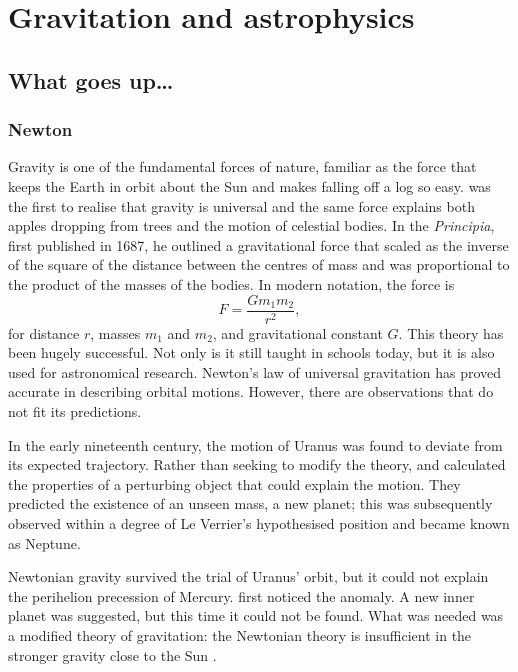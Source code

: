 \chapter{Gravitation and astrophysics}\label{ch:Let-there-be-gravity}

\section{What goes up\ldots}

\subsection{Newton}

Gravity is one of the fundamental forces of nature, familiar as the force that keeps the Earth in orbit about the Sun and makes falling off a log so easy. \citet[book 3]{Newton1999} was the first to realise that gravity is universal and the same force explains both apples dropping from trees and the motion of celestial bodies. In the \textit{Principia}, first published in 1687, he outlined a gravitational force that scaled as the inverse of the square of the distance between the centres of mass and was proportional to the product of the masses of the bodies. In modern notation, the force is
\begin{equation}
F = \dfrac{G m_1 m_2}{r^2},
\end{equation}
for distance $r$, masses $m_1$ and $m_2$, and gravitational constant $G$. This theory has been hugely successful. Not only is it still taught in schools today, but it is also used for astronomical research. Newton's law of universal gravitation has proved accurate in describing orbital motions. However, there are observations that do not fit its predictions.

In the early nineteenth century, the motion of Uranus was found to deviate from its expected trajectory. Rather than seeking to modify the theory, \citet[\textit{troisi{\`e}me partie}]{LeVerrier1846} and \citet[papers 1, 2]{Adams1896} calculated the properties of a perturbing object that could explain the motion. They predicted the existence of an unseen mass, a new planet; this was subsequently observed within a degree of Le Verrier's hypothesised position \citep[\textit{cinqui{\`e}me partie}]{LeVerrier1846} and became known as Neptune.

Newtonian gravity survived the trial of Uranus' orbit, but it could not explain the perihelion precession of Mercury. \citet[\textit{chapitre XV}, \textit{section quatri{\`e}me}]{LeVerrier1859} first noticed the anomaly. A new inner planet was suggested, but this time it could not be found. What was needed was a modified theory of gravitation: the Newtonian theory is insufficient in the stronger gravity close to the Sun \citep[document 24]{Einstein1997}.

